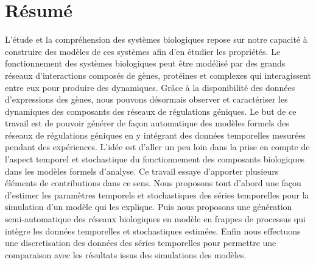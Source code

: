 
\chapter{Résumé}

L'étude et la compréhension des systèmes biologiques repose sur notre capacité à construire des modèles de ces systèmes afin d'en étudier  
les propriétés. Le fonctionnement des systèmes biologiques peut être modélisé  par des grands réseaux d'interactions composés de gènes,
protéines et complexes qui interagissent entre eux pour produire des dynamiques. Grâce à la disponibilité des données d'expressions des gènes,
nous pouvons désormais observer et caractériser les dynamiques des composants des réseaux de régulations géniques. Le but de ce travail est de pouvoir 
générer de façon automatique des modèles formels des réseaux de régulations géniques en y intégrant des données temporelles mesurées pendant des expériences.
L'idée est d'aller un peu loin dans la prise en compte de l'aspect temporel et stochastique du fonctionnement des composants biologiques dans les modèles 
formels d'analyse. Ce travail essaye d'apporter plusieurs éléments de contributions dans ce sens. Nous proposons tout d'abord une façon d'estimer les paramètres temporels
et stochastiques des séries temporelles pour la simulation d'un modèle qui les explique. Puis nous proposons une génération semi-automatique des réseaux biologiques en  modèle en frappes de processus qui intègre 
les données temporelles et stochastiques estimées. Enfin nous effectuons  une discretisation des données des séries temporelles pour permettre une comparaison avec les 
résultats issus des simulations des modèles.




